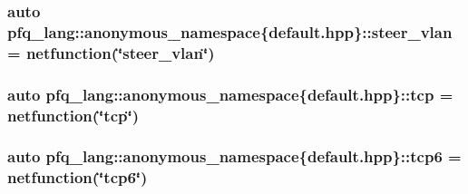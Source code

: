 \hypertarget{namespacepfq__lang_1_1anonymous__namespace_02default_8hpp_03_ad32804252244d5b572b9f5fe0cdda675}{
\subsubsection[{steer\+\_\+vlan}]{\setlength{\rightskip}{0pt plus 5cm}auto pfq\+\_\+lang\+::anonymous\+\_\+namespace\{default.\+hpp\}\+::steer\+\_\+vlan = {\bf netfunction}(\char`\"{}steer\+\_\+vlan\char`\"{})}}\label{namespacepfq__lang_1_1anonymous__namespace_02default_8hpp_03_ad32804252244d5b572b9f5fe0cdda675}
\hypertarget{namespacepfq__lang_1_1anonymous__namespace_02default_8hpp_03_a4046140746c0012b4d1ea8d3ef53f084}{
\subsubsection[{tcp}]{\setlength{\rightskip}{0pt plus 5cm}auto pfq\+\_\+lang\+::anonymous\+\_\+namespace\{default.\+hpp\}\+::tcp = {\bf netfunction}(\char`\"{}tcp\char`\"{})}}\label{namespacepfq__lang_1_1anonymous__namespace_02default_8hpp_03_a4046140746c0012b4d1ea8d3ef53f084}
\hypertarget{namespacepfq__lang_1_1anonymous__namespace_02default_8hpp_03_a734af11014e5ccaef77d6fa39cea0d6b}{
\subsubsection[{tcp6}]{\setlength{\rightskip}{0pt plus 5cm}auto pfq\+\_\+lang\+::anonymous\+\_\+namespace\{default.\+hpp\}\+::tcp6 = {\bf netfunction}(\char`\"{}tcp6\char`\"{})}}\label{namespacepfq__lang_1_1anonymous__namespace_02default_8hpp_03_a734af11014e5ccaef77d6fa39cea0d6b}
